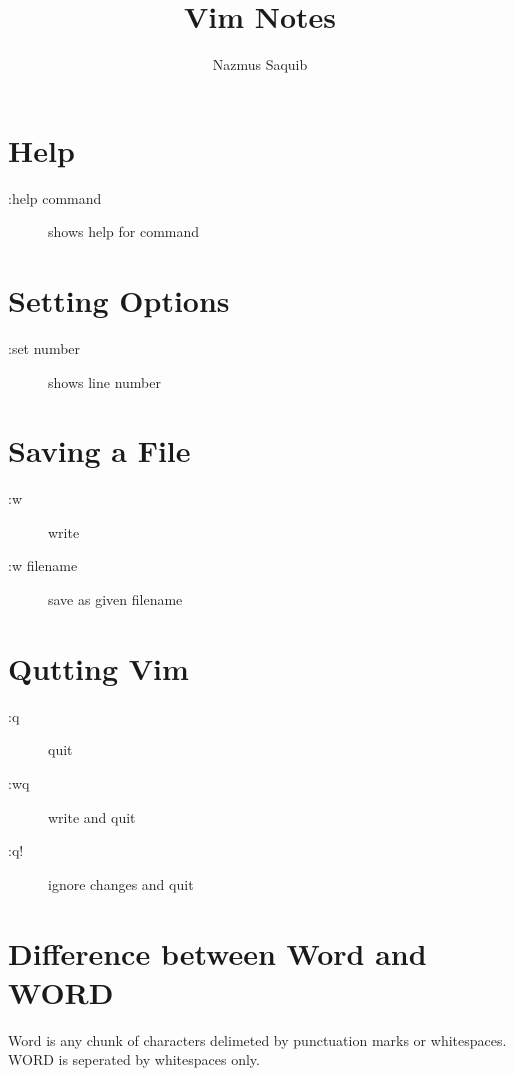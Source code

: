 \documentclass[a4paper, 12pt]{article}
\begin{document}
\title{Vim Notes}
\author{Nazmus Saquib}

\maketitle
\tableofcontents

\section{Help}
\begin{description}
	\item[:help command] shows help for command
\end{description}

\section{Setting Options}
\begin{description}
	\item[:set number] shows line number
\end{description}

\section{Saving a File}
\begin{description}
	\item[:w] write
	\item[:w filename] save as given filename
\end{description}

\section{Qutting Vim}
\begin{description}
	\item[:q] quit
	\item[:wq] write and quit
	\item[:q!] ignore changes and quit
\end{description}

\section{Difference between Word and WORD}
Word is any chunk of characters delimeted by punctuation marks or whitespaces. WORD is seperated by whitespaces only.
\end{document}

